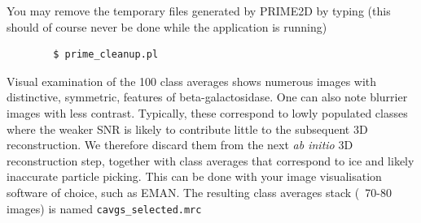 \documentclass[a4paper,11pt]{article}
\begin{document}
You may remove the temporary files generated by PRIME2D by typing (this should of course never be done while the application is running)
\begin{verbatim}
        $ prime_cleanup.pl
\end{verbatim}
Visual examination of the 100 class averages shows numerous images with distinctive, symmetric, features of beta-galactosidase. One can also note blurrier images with less contrast. Typically, these correspond to lowly populated classes where the weaker SNR is likely to contribute little to the subsequent 3D reconstruction. We therefore discard them from the next \textit{ab initio} 3D reconstruction step, together with class averages that correspond to ice and likely inaccurate particle picking. This can be done with your image visualisation software of choice, such as EMAN. The resulting class averages stack (~70-80 images) is named \texttt{cavgs\_selected.mrc}
\end{document}
